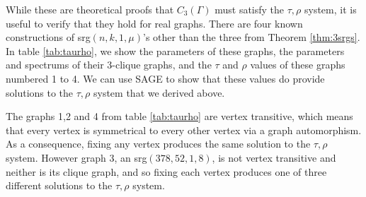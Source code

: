\documentclass[12pt]{report}
\theoremstyle{definition}
\begin{document}
While these are theoretical proofs that $C_3(\Gamma)$ must satisfy the $\tau,\rho$ system, it is useful to verify that they hold for real graphs. There are four known constructions of srg$(n,k,1,\mu)$'s other than the three from Theorem \ref{thm:3srgs}. In table \ref{tab:taurho}, we show the parameters of these graphs, the parameters and spectrums of their 3-clique graphs, and the $\tau$ and $\rho$ values of these graphs numbered 1 to 4. We can use SAGE to show that these values do provide solutions to the $\tau,\rho$ system that we derived above.\par
The graphs 1,2 and 4 from table \ref{tab:taurho} are vertex transitive, which means that every vertex is symmetrical to every other vertex via a graph automorphism. As a consequence, fixing any vertex produces the same solution to the $\tau,\rho$ system. However graph 3, an srg$(378,52,1,8)$, is not vertex transitive and neither is its clique graph, and so fixing each vertex produces one of three different solutions to the $\tau,\rho$ system.\par
\end{document}
